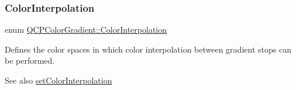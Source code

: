 \subsubsection{\texorpdfstring{Color\+Interpolation}{ColorInterpolation}\hspace{0.1cm}{\footnotesize\ttfamily [2/2]}}
{\footnotesize\ttfamily enum \hyperlink{class_q_c_p_color_gradient_ac5dca17cc24336e6ca176610e7f77fc1}{Q\+C\+P\+Color\+Gradient\+::\+Color\+Interpolation}}

Defines the color spaces in which color interpolation between gradient stops can be performed.

\begin{DoxySeeAlso}{See also}
\hyperlink{class_q_c_p_color_gradient_aa13fda86406e1d896a465a409ae63b38}{set\+Color\+Interpolation} 
\end{DoxySeeAlso}
